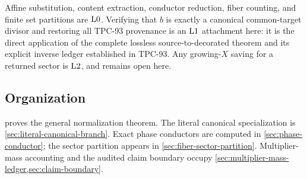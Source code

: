 Affine substitution, content extraction, conductor reduction,
fiber counting, and finite set partitions are \(\mathrm{L0}\).  Verifying
that \(b\) is exactly a canonical common-target divisor and restoring
all TPC-93 provenance is an \(\mathrm{L1}\) attachment here: it is the
direct application of the complete lossless source-to-decorated
theorem and its explicit inverse ledger established in TPC-93.
Any growing-\(X\) saving for a returned sector is
\(\mathrm{L2}\), and remains open here.

\subsection{Organization}

 proves the general normalization
theorem.  The literal canonical specialization is
\cref{sec:literal-canonical-branch}.  Exact phase conductors are
computed in \cref{sec:phase-conductor}; the sector partition appears
in \cref{sec:fiber-sector-partition}.  Multiplier-mass accounting and
the audited claim boundary occupy
\cref{sec:multiplier-mass-ledger,sec:claim-boundary}.
